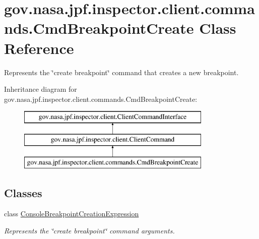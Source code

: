 \hypertarget{classgov_1_1nasa_1_1jpf_1_1inspector_1_1client_1_1commands_1_1_cmd_breakpoint_create}{}\section{gov.\+nasa.\+jpf.\+inspector.\+client.\+commands.\+Cmd\+Breakpoint\+Create Class Reference}
\label{classgov_1_1nasa_1_1jpf_1_1inspector_1_1client_1_1commands_1_1_cmd_breakpoint_create}


Represents the \char`\"{}create breakpoint\char`\"{} command that creates a new breakpoint.  


Inheritance diagram for gov.\+nasa.\+jpf.\+inspector.\+client.\+commands.\+Cmd\+Breakpoint\+Create\+:\begin{figure}[H]
\begin{center}
\leavevmode
\includegraphics[height=3.000000cm]{classgov_1_1nasa_1_1jpf_1_1inspector_1_1client_1_1commands_1_1_cmd_breakpoint_create}
\end{center}
\end{figure}
\subsection*{Classes}
\begin{DoxyCompactItemize}
\item 
class \hyperlink{classgov_1_1nasa_1_1jpf_1_1inspector_1_1client_1_1commands_1_1_cmd_breakpoint_create_1_1_console_breakpoint_creation_expression}{Console\+Breakpoint\+Creation\+Expression}
\begin{DoxyCompactList}\small\item\em Represents the \char`\"{}create breakpoint\char`\"{} command arguments. \end{DoxyCompactList}\end{DoxyCompactItemize}
